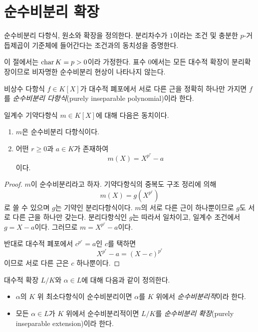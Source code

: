 \section{순수비분리 확장}
\label{sec:purely-inseparable}

\begin{learninggoal}
순수비분리 다항식, 원소와 확장을 정의한다. 분리차수가 $1$이라는 조건 및 충분한 $p$-거듭제곱이 기준체에 들어간다는 조건과의 동치성을 증명한다.
\end{learninggoal}

이 절에서는 $\operatorname{char} K=p>0$이라 가정한다. 표수 $0$에서는 모든 대수적 확장이 분리확장이므로 비자명한 순수비분리 현상이 나타나지 않는다.

\begin{definition}
비상수 다항식 $f\in K[X]$가 대수적 폐포에서 서로 다른 근을 정확히 하나만 가지면 $f$를 \emph{순수비분리 다항식}(purely inseparable polynomial)이라 한다.
\end{definition}

\begin{proposition}
일계수 기약다항식 $m\in K[X]$에 대해 다음은 동치이다.
\begin{enumerate}[label=(\roman*)]
  \item $m$은 순수비분리 다항식이다.
  \item 어떤 $r\ge0$과 $a\in K$가 존재하여
  \[
    m(X)=X^{p^r}-a
  \]
  이다.
\end{enumerate}
\end{proposition}

\begin{proof}
$m$이 순수비분리라고 하자. 기약다항식의 중복도 구조 정리에 의해
\[
  m(X)=g(X^{p^r})
\]
로 쓸 수 있으며 $g$는 기약인 분리다항식이다. $m$의 서로 다른 근이 하나뿐이므로 $g$도 서로 다른 근을 하나만 갖는다. 분리다항식인 $g$는 따라서 일차이고, 일계수 조건에서 $g=X-a$이다. 그러므로 $m=X^{p^r}-a$이다.

반대로 대수적 폐포에서 $c^{p^r}=a$인 $c$를 택하면
\[
  X^{p^r}-a=(X-c)^{p^r}
\]
이므로 서로 다른 근은 $c$ 하나뿐이다.
\end{proof}

\begin{definition}
대수적 확장 $L/K$와 $\alpha\in L$에 대해 다음과 같이 정의한다.
\begin{itemize}
  \item $\alpha$의 $K$ 위 최소다항식이 순수비분리이면 $\alpha$를 $K$ 위에서 \emph{순수비분리적}이라 한다.
  \item 모든 $\alpha\in L$가 $K$ 위에서 순수비분리적이면 $L/K$를 \emph{순수비분리 확장}(purely inseparable extension)이라 한다.
\end{itemize}
\end{definition}

